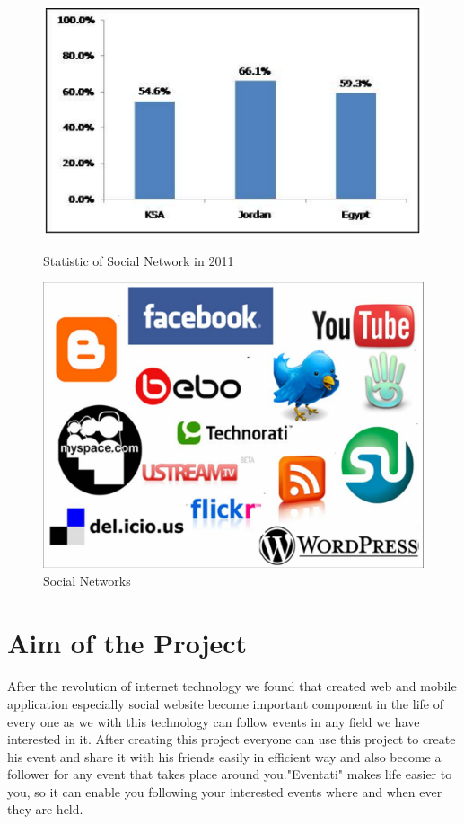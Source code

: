 \documentclass[12pt,a4paper,class,twoside,openany]{report}
\begin{document}
   \begin{figure}
	\begin{minipage}[b]{0.5\linewidth}
	\centering
	\includegraphics[scale=.6]{1-1}
	\caption{Statistic of Social Network in 2011}
	\label{fg:1-1}
	\end{minipage}
	\hspace{0.5cm}
	\begin{minipage}[b]{0.5\linewidth}
	\centering
	\includegraphics[width=\textwidth]{1-2.jpg}
	\caption{Social Networks}
	\label{fg:1-2}
	\end{minipage}
	\end{figure}
	
\section{Aim of the Project}
\paragraph*{\hspace{.9 cm} } After the revolution of internet technology we found that created web and mobile application especially social website become important component in the life of every one as we with this technology can follow events in any field we have interested in it. After creating this project everyone can use this project to create his event and share it with his friends easily  in efficient way and also become a follower for any event that takes place around you."Eventati" makes life easier to you, so it can enable you following your interested events where and when ever they are held.
\end{document}
